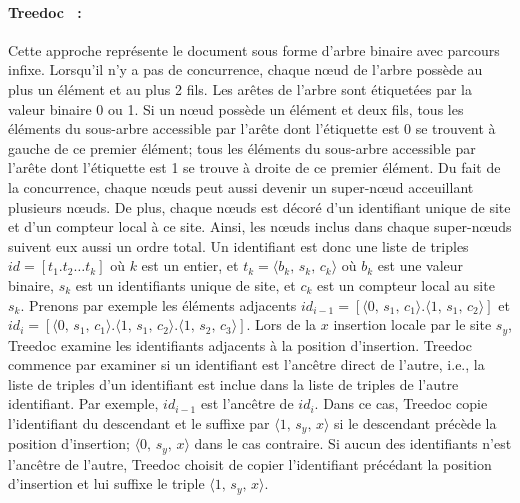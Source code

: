 \paragraph{Treedoc~\cite{letia2009crdts, preguica2009commutative} :} Cette
approche représente le document sous forme d'arbre binaire avec parcours infixe.
Lorsqu'il n'y a pas de concurrence, chaque nœud de l'arbre possède au plus un
élément et au plus 2 fils. Les arêtes de l'arbre sont étiquetées par la valeur
binaire 0 ou 1.  Si un nœud possède un élément et deux fils, tous les éléments
du sous-arbre accessible par l'arête dont l'étiquette est 0 se trouvent à gauche
de ce premier élément; tous les éléments du sous-arbre accessible par l'arête
dont l'étiquette est 1 se trouve à droite de ce premier élément. Du fait de la
concurrence, chaque nœuds peut aussi devenir un super-nœud acceuillant plusieurs
nœuds. De plus, chaque nœuds est décoré d'un identifiant unique de site et d'un
compteur local à ce site. Ainsi, les nœuds inclus dans chaque super-nœuds
suivent eux aussi un ordre total. Un identifiant est donc une liste de triples
$id = [t_1.t_2\ldots t_k]$ où $k$ est un entier, et
$t_k = \langle b_k,\, s_k,\, c_k\rangle$ où $b_k$ est une valeur binaire, $s_k$
est un identifiants unique de site, et $c_k$ est un compteur local au site
$s_k$.  Prenons par exemple les éléments adjacents
$id_{i-1}=[\langle 0,\,s_1,\,c_1 \rangle.\langle 1,\,s_1,\,c_2 \rangle]$ et
$id_i=[\langle 0,\,s_1,\,c_1 \rangle.\langle 1,\,s_1,\,c_2 \rangle. \langle 1,\,
s_2,\, c_3 \rangle]$.
Lors de la $x$ insertion locale par le site $s_y$, Treedoc examine les
identifiants adjacents à la position d'insertion. Treedoc commence par examiner
si un identifiant est l'ancêtre direct de l'autre, i.e., la liste de triples
d'un identifiant est inclue dans la liste de triples de l'autre identifiant. Par
exemple, $id_{i-1}$ est l'ancêtre de $id_i$. Dans ce cas, Treedoc copie
l'identifiant du descendant et le suffixe par $\langle 1,\, s_y,\, x \rangle$ si
le descendant précède la position d'insertion; $\langle 0,\, s_y,\, x \rangle$
dans le cas contraire. Si aucun des identifiants n'est l'ancêtre de l'autre,
Treedoc choisit de copier l'identifiant précédant la position d'insertion et lui
suffixe le triple $\langle 1,\, s_y,\, x \rangle$.

%     

